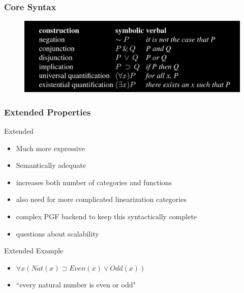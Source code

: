 \documentclass[9pt]{beamer}
\begin{document}
\begin{frame}
\frametitle{Core Syntax}

\begin{figure}
\hspace*{-3mm}%
   \includegraphics[width= \paperwidth]{core.png}
\end{figure}

\end{frame}

\begin{frame}
\frametitle{Extended Properties}

\begin{block}{Extended}
\begin{itemize}
\item Much more expressive
\item Semantically adequate
\item increases both number of categories and functions
\item also need for more complicated linearization categories
\item complex PGF backend to keep this syntactically complete
\item questions about scalability
\end{itemize}

\end{block}

\begin{exampleblock}{Extended Example}
\begin{itemize}
\item $\forall x (Nat(x) \supset Even(x) \lor Odd(x))$
\item ``every natural number is even or odd"
\end{itemize}
\end{exampleblock}

\end{frame}
\end{document}
